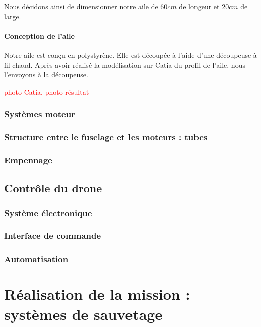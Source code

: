\documentclass[a4paper,12pt,french]{report}
\begin{document}
    Nous décidons ainsi de dimensionner notre aile de $60cm$ de longeur et $20cm$ de large.

\subsubsection*{Conception de l'aile}

Notre aile est conçu en polystyrène. Elle est découpée à l'aide d'une découpeuse à fil chaud. Après avoir réalisé la modélisation sur Catia du profil de l'aile, nous l'envoyons à la découpeuse.

\textcolor{red}{photo Catia, photo résultat}

\subsection{Systèmes moteur}

\subsection{Structure entre le fuselage et les moteurs : tubes}


\subsection{Empennage}

\section{Contrôle du drone}

\subsection{Système électronique}

\subsection{Interface de commande}

\subsection{Automatisation}

\chapter{Réalisation de la mission : systèmes de sauvetage}
\end{document}
